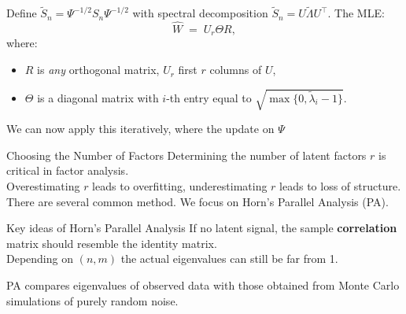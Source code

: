 \documentclass[11pt,handout,aspectratio=169]{beamer}
\begin{document}
\begin{frame}{}
\begin{block}{}
	Define $\tilde S_n=\Psi^{-1/2}S_n\Psi^{-1/2}$ with spectral decomposition $\tilde S_n=U\tilde\Lambda U^\top$. The MLE:
	$$
	\widehat W\;=\;U_r \Theta R,
	$$
	where:
	\begin{itemize}
		\item $R$ is \emph{any} orthogonal matrix, $U_r$ first $r$ columns of $U$,
		\item $\Theta$ is a diagonal matrix with $i$-th entry equal to $\sqrt{\max\{0,\tilde \lambda_i-1\}}$.
	\end{itemize}
\end{block}
We can now apply this iteratively, where the update on $\Psi$ 
	\end{frame}

\begin{frame}{Choosing the Number of Factors}
Determining the number of latent factors \( r \) is critical in factor analysis.\\[4mm]  
Overestimating \( r \) leads to overfitting, underestimating \( r \) leads to loss of structure.\\[4mm]
There are several common method. We focus on Horn's Parallel Analysis (PA).
%    
\begin{alertblock}{Key ideas of Horn's Parallel Analysis}
	If no latent signal, the sample \textbf{correlation} matrix should resemble the identity matrix.\\[4mm]
	Depending on $(n,m)$ the actual eigenvalues can still be far from 1.
\end{alertblock}

 PA compares eigenvalues of observed data with those obtained from Monte Carlo simulations of purely random noise.\end{frame}
\end{document}
